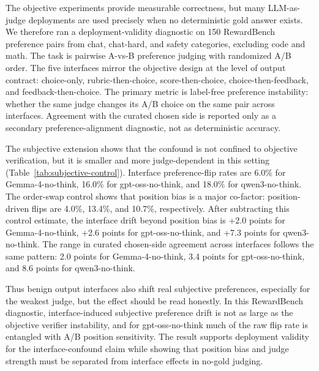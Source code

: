 \documentclass[journal]{IEEEtran}
\begin{document}
The objective experiments provide measurable correctness, but many LLM-as-judge deployments are used precisely when no deterministic gold answer exists. We therefore ran a deployment-validity diagnostic on 150 RewardBench preference pairs from chat, chat-hard, and safety categories, excluding code and math. The task is pairwise A-vs-B preference judging with randomized A/B order. The five interfaces mirror the objective design at the level of output contract: choice-only, rubric-then-choice, score-then-choice, choice-then-feedback, and feedback-then-choice. The primary metric is label-free preference instability: whether the same judge changes its A/B choice on the same pair across interfaces. Agreement with the curated chosen side is reported only as a secondary preference-alignment diagnostic, not as deterministic accuracy.

The subjective extension shows that the confound is not confined to objective verification, but it is smaller and more judge-dependent in this setting (Table~\ref{tab:subjective-control}). Interface preference-flip rates are 6.0\% for Gemma-4-no-think, 16.0\% for gpt-oss-no-think, and 18.0\% for qwen3-no-think. The order-swap control shows that position bias is a major co-factor: position-driven flips are 4.0\%, 13.4\%, and 10.7\%, respectively. After subtracting this control estimate, the interface drift beyond position bias is +2.0 points for Gemma-4-no-think, +2.6 points for gpt-oss-no-think, and +7.3 points for qwen3-no-think. The range in curated chosen-side agreement across interfaces follows the same pattern: 2.0 points for Gemma-4-no-think, 3.4 points for gpt-oss-no-think, and 8.6 points for qwen3-no-think.

Thus benign output interfaces also shift real subjective preferences, especially for the weakest judge, but the effect should be read honestly. In this RewardBench diagnostic, interface-induced subjective preference drift is not as large as the objective verifier instability, and for gpt-oss-no-think much of the raw flip rate is entangled with A/B position sensitivity. The result supports deployment validity for the interface-confound claim while showing that position bias and judge strength must be separated from interface effects in no-gold judging.
\end{document}
